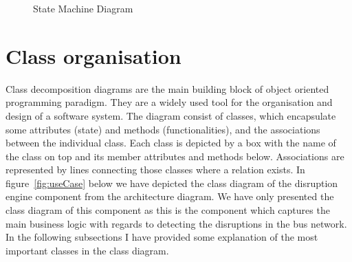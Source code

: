 \begin{figure}
	\caption{State Machine Diagram}
\label{fig:stateMachine}
\end{figure}

\FloatBarrier
\section{Class organisation}
Class decomposition diagrams are the main building block of object oriented programming paradigm. They are a widely used tool for the organisation and design of a software system. The diagram consist of classes, which encapsulate some attributes (state) and methods (functionalities), and the associations between the individual class. Each class is depicted by a box with the name of the class on top and its member attributes and methods below. Associations are represented by lines connecting those classes where a relation exists. In figure~\ref{fig:useCase} below we have depicted the class diagram of the disruption engine component from the architecture diagram. We have only presented the class diagram of this component as this is the component which captures the main business logic with regards to detecting the disruptions in the bus network. In the following subsections I have provided some explanation of the most important classes in the class diagram.


